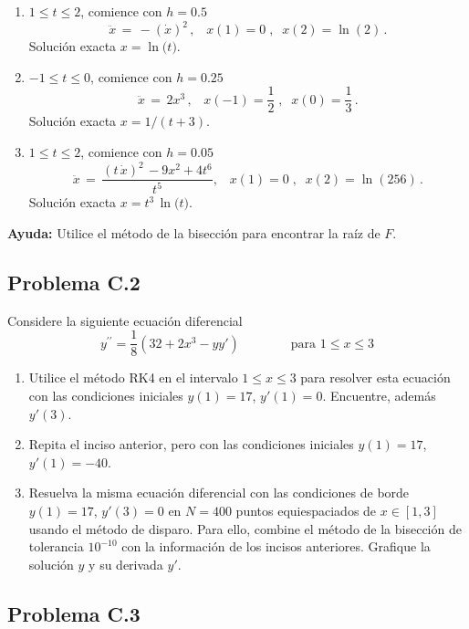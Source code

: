 \documentclass[11pt]{article}
\begin{document}
\begin{enumerate}
\def\labelenumi{\arabic{enumi}.}
\item
  \(1\leq t\leq 2\), comience con \(h=0.5\) \[
  \ddot{x}\,=\,-(\dot{x})^2 \,,\;\;\;x(1)=0\;,\;\;x(2)=\ln{(2)} \,.
  \] Solución exacta \(x=\ln{(t})\).
\item
  \(-1\leq t\leq 0\), comience con \(h=0.25\) \[
  \ddot{x}\,=\,2 x^3\,,\;\;\;x(-1)=\frac{1}{2}\;,\;\;x(0)=\frac{1}{3} \,.
  \] Solución exacta \(x=1/(t+3)\).
\item
  \(1\leq t\leq 2\), comience con \(h=0.05\) \[
  \ddot{x}\,=\,\frac{(t\,\dot{x} )^2\,-9 x^2+4 t^6}{t^5},\;\;\;x(1)=0\;,\;\;x(2)=\ln{(256)} \,.
  \] Solución exacta \(x=t^3\,\ln{(t})\).
\end{enumerate}

\textbf{Ayuda:} Utilice el método de la bisección para encontrar la raíz
de \(F\).

    \hypertarget{problema-c.2}{%
\subsection*{Problema C.2}\label{problema-c.2}}

Considere la siguiente ecuación diferencial \[
y^{\prime \prime} = \frac{1}{8} \left( 32 + 2 x^3 - y y' \right)    \qquad \qquad \mbox{para }
1 \le x \le 3
\] 

\begin{enumerate}
\def\labelenumi{\arabic{enumi}.}
\setcounter{enumi}{1}
\item 
  Utilice el método RK4 en el intervalo \(1 \le x\le 3\) para
  resolver esta ecuación con las condiciones iniciales \(y(1) = 17\),
  \(y'(1) = 0\). Encuentre, además \(y'(3)\).
\item
  Repita el inciso anterior, pero con las condiciones iniciales
  \(y(1) = 17\), \(y'(1) = -40\).
\item
  Resuelva la misma ecuación diferencial con las condiciones de borde
  \(y(1) = 17\), \(y' (3) = 0\) en \(N=400\) puntos equiespaciados de
  \(x\in [1,3]\) usando el método de disparo. Para ello, combine el
  método de la bisección de tolerancia \(10^{-10}\) con la información
  de los incisos anteriores. Grafique la solución \(y\) y su derivada
  \(y'\).
\end{enumerate}

    \hypertarget{problema-c.3}{%
\subsection*{Problema C.3}\label{problema-c.3}}
\end{document}
